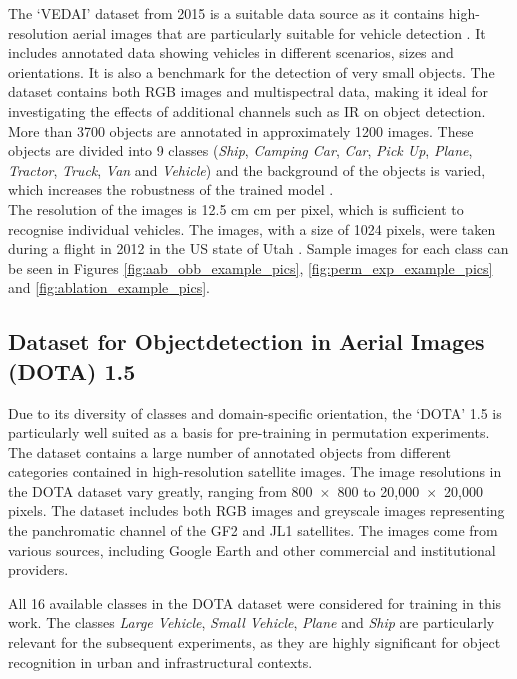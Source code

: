 The ‘\Acrfull{VEDAI}’ dataset \cite{vedai_web}  from 2015 is a suitable data source as it contains high-resolution aerial images that are particularly suitable for vehicle detection \cite{Razakarivony2015}. It includes annotated data showing vehicles in different scenarios, sizes and orientations. It is also a benchmark for the detection of very small objects. The dataset contains both \acrshort{RGB} images and multispectral data, making it ideal for investigating the effects of additional channels such as \acrshort{IR} on object detection. More than 3700 objects are annotated in approximately 1200 images. These objects are divided into 9 classes (\textit{Ship}, \textit{Camping Car}, \textit{Car}, \textit{Pick Up}, \textit{Plane}, \textit{Tractor}, \textit{Truck}, \textit{Van} and \textit{Vehicle}) and the background of the objects is varied, which increases the robustness of the trained model \cite{Razakarivony2015}. \\
The resolution of the images is 12.5 cm  cm per pixel, which is sufficient to recognise individual vehicles. The images, with a size of 1024  pixels, were taken during a flight in 2012 in the US state of Utah \cite{Razakarivony2015}. Sample images for each class can be seen in Figures \ref{fig:aab_obb_example_pics}, \ref{fig:perm_exp_example_pics} and \ref{fig:ablation_example_pics}.



\subsection{Dataset for Objectdetection in Aerial Images (DOTA) 1.5}
\label{subsec:DOTA}
Due to its diversity of classes and domain-specific orientation, the ‘\Acrfull{DOTA}’ 1.5 is particularly well suited as a basis for pre-training in permutation experiments. The dataset contains a large number of annotated objects from different categories contained in high-resolution satellite images. The image resolutions in the \acrshort{DOTA} dataset vary greatly, ranging from 800~$\times$~800 to 20,000~$\times$~20,000 pixels. The dataset includes both \acrshort{RGB} images and greyscale images representing the panchromatic channel of the GF2 and JL1 satellites. The images come from various sources, including Google Earth and other commercial and institutional providers.

All 16 available classes in the DOTA dataset were considered for training in this work. The classes \textit{Large Vehicle}, \textit{Small Vehicle}, \textit{Plane} and \textit{Ship} are particularly relevant for the subsequent experiments, as they are highly significant for object recognition in urban and infrastructural contexts.

